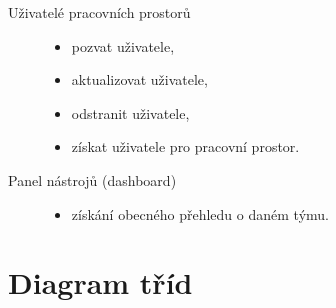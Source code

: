 \documentclass[thesis=B,czech]{FITthesis}[2012/06/26]
\begin{document}
\begin{description}
		\item[Uživatelé pracovních prostorů] \hspace*{\fill} 
		\begin{itemize} 
			\item pozvat uživatele,
			\item aktualizovat uživatele,
			\item odstranit uživatele,
			\item získat uživatele pro pracovní prostor.
		\end{itemize} 
		
		\item[Panel nástrojů (dashboard)] \hspace*{\fill} 
		\begin{itemize} 
			\item získání obecného přehledu o daném týmu.
		\end{itemize} 
	\end{description}

\section{Diagram tříd}	
\end{document}
